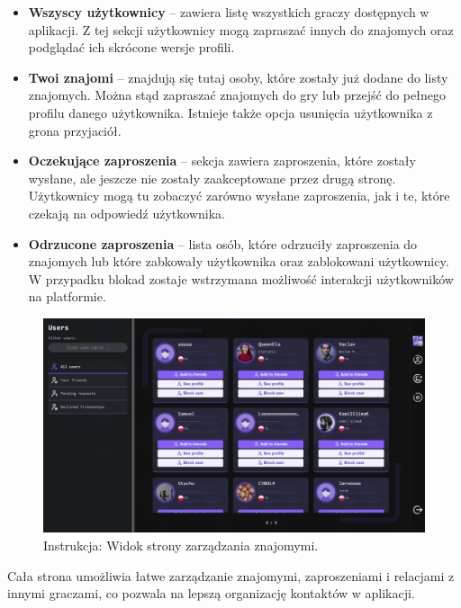 \documentclass[12pt,a4paper]{article}
\begin{document}
\begin{itemize}
    \item \textbf{Wszyscy użytkownicy} – zawiera listę wszystkich graczy dostępnych w aplikacji. Z tej sekcji użytkownicy mogą zapraszać innych do znajomych oraz podglądać ich skrócone wersje profili.
    \item \textbf{Twoi znajomi} – znajdują się tutaj osoby, które zostały już dodane do listy znajomych. Można stąd zapraszać znajomych do gry lub przejść do pełnego profilu danego użytkownika. Istnieje także opcja usunięcia użytkownika z grona przyjaciół.
    \item \textbf{Oczekujące zaproszenia} – sekcja zawiera zaproszenia, które zostały wysłane, ale jeszcze nie zostały zaakceptowane przez drugą stronę. Użytkownicy mogą tu zobaczyć zarówno wysłane zaproszenia, jak i te, które czekają na odpowiedź użytkownika.
    \item \textbf{Odrzucone zaproszenia} – lista osób, które odrzuciły zaproszenia do znajomych lub które zabkowały użytkownika oraz zablokowani użytkownicy. W przypadku blokad zostaje wstrzymana możliwość interakcji użytkowników na platformie.
\end{itemize}



\vspace{0.5cm}
\begin{figure}[h!]
    \centering
    \includegraphics[width=1\textwidth]{images/ins_users.png}
    \caption{Instrukcja: Widok strony zarządzania znajomymi.}
\end{figure}
\vspace{0.5cm}

\noindent
Cała strona umożliwia łatwe zarządzanie znajomymi, zaproszeniami i relacjami z innymi graczami, co pozwala na lepszą organizację kontaktów w aplikacji.
\end{document}

